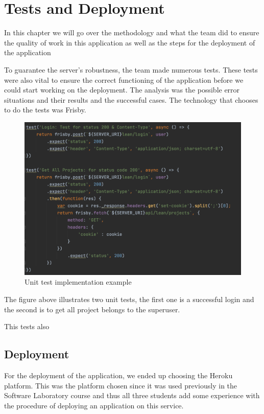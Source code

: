 \documentclass[a4paper,twoside,10pt]{report}
\begin{document}
\chapter{Tests and Deployment}
In this chapter we will go over the methodology and what the team did to ensure the quality of work in this application as well as the steps for the deployment of the application

To guarantee the server's robustness, the team made numerous tests. These tests were also vital to ensure the correct functioning of the application before we could start working on the deployment.  The analysis was the possible error situations and their results and the successful cases. The technology that chooses to do the tests was Frisby.

\begin{figure}[h!]
\center
  \includegraphics[width=\textwidth]{tests.png}
\caption{Unit test implementation example}
\end{figure}

The figure above illustrates two unit tests, the first one is a successful login and the second is to get all project belongs to the superuser.

This tests also

\section{Deployment}
For the deployment of the application, we ended up choosing the Heroku platform. This was the platform chosen since it was used previously in the Software Laboratory course and thus all three students add some experience with the procedure of deploying an application on this service.
\end{document}
